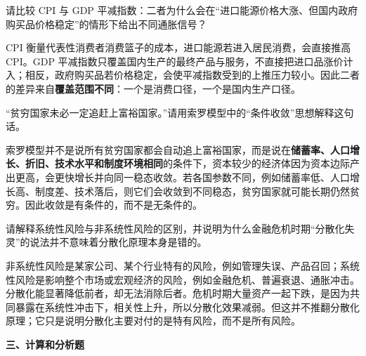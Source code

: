 \begin{question}
请比较 CPI 与 GDP 平减指数：二者为什么会在“进口能源价格大涨、但国内政府购买品价格稳定”的情形下给出不同通胀信号？
\begin{solution}
CPI 衡量代表性消费者消费篮子的成本，进口能源若进入居民消费，会直接推高 CPI。GDP 平减指数只覆盖国内生产的最终产品与服务，不直接把进口品涨价计入；相反，政府购买品若价格稳定，会使平减指数受到的上推压力较小。因此二者的差异来自\textbf{覆盖范围不同}：一个是消费口径，一个是国内生产口径。\end{solution}
\end{question}

\begin{question}
“贫穷国家未必一定追赶上富裕国家。”请用索罗模型中的“条件收敛”思想解释这句话。
\begin{solution}
索罗模型并不是说所有贫穷国家都会自动追上富裕国家，而是说在\textbf{储蓄率、人口增长、折旧、技术水平和制度环境相同}的条件下，资本较少的经济体因为资本边际产出更高，会更快增长并向同一稳态收敛。若各国参数不同，例如储蓄率低、人口增长高、制度差、技术落后，则它们会收敛到不同稳态，贫穷国家就可能长期仍然贫穷。因此收敛是有条件的，而不是无条件的。\end{solution}
\end{question}

\begin{question}
请解释系统性风险与非系统性风险的区别，并说明为什么金融危机时期“分散化失灵”的说法并不意味着分散化原理本身是错的。
\begin{solution}
非系统性风险是某家公司、某个行业特有的风险，例如管理失误、产品召回；系统性风险是影响整个市场或宏观经济的风险，例如金融危机、普遍衰退、通胀冲击。分散化能显著降低前者，却无法消除后者。危机时期大量资产一起下跌，是因为共同暴露在系统性冲击下，相关性上升，所以分散化效果减弱。但这并不推翻分散化原理；它只是说明分散化主要对付的是特有风险，而不是所有风险。\end{solution}
\end{question}

\textbf{三、计算和分析题}

